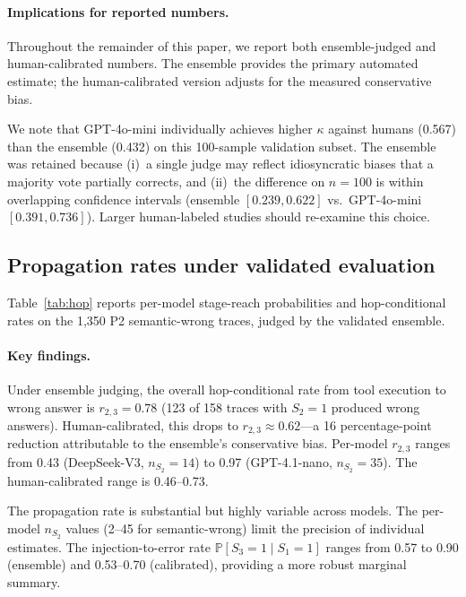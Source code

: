 \documentclass{ieeeaccess}
\renewcommand{\Pr}{\mathbb{P}}
\begin{document}


\paragraph{Implications for reported numbers.}
Throughout the remainder of this paper, we report both ensemble-judged
and human-calibrated numbers.
The ensemble provides the primary automated estimate; the
human-calibrated version adjusts for the measured conservative bias.

We note that GPT-4o-mini individually achieves higher $\kappa$ against
humans (0.567) than the ensemble (0.432) on this 100-sample validation
subset.
The ensemble was retained because (i)~a single judge may reflect
idiosyncratic biases that a majority vote partially corrects, and
(ii)~the difference on $n{=}100$ is within overlapping confidence
intervals (ensemble $[0.239, 0.622]$ vs.\ GPT-4o-mini
$[0.391, 0.736]$).
Larger human-labeled studies should re-examine this choice.

\subsection{Propagation rates under validated evaluation}
\label{sec:propagation}

Table~\ref{tab:hop} reports per-model stage-reach probabilities and
hop-conditional rates on the 1{,}350 P2 semantic-wrong traces, judged
by the validated ensemble.



\paragraph{Key findings.}
Under ensemble judging, the overall hop-conditional rate from tool
execution to wrong answer is $r_{2,3} = 0.78$ (123 of 158 traces with
$S_2{=}1$ produced wrong answers).
Human-calibrated, this drops to $r_{2,3} \approx 0.62$---a 16
percentage-point reduction attributable to the ensemble's conservative
bias.
Per-model $r_{2,3}$ ranges from 0.43 (DeepSeek-V3, $n_{S_2}{=}14$)
to 0.97 (GPT-4.1-nano, $n_{S_2}{=}35$).
The human-calibrated range is 0.46--0.73.

The propagation rate is substantial but highly variable across models.
The per-model $n_{S_2}$ values (2--45 for semantic-wrong) limit the
precision of individual estimates.
The injection-to-error rate $\Pr[S_3{=}1 \mid S_1{=}1]$ ranges from
0.57 to 0.90 (ensemble) and 0.53--0.70 (calibrated), providing a more
robust marginal summary.
\end{document}

